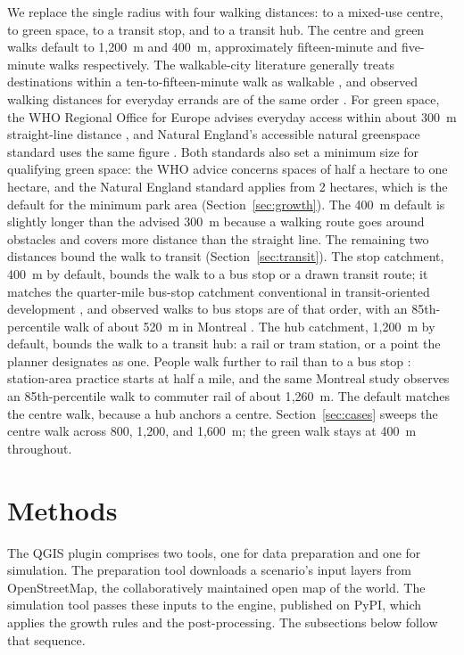 \documentclass[11pt]{article}
\begin{document}
We replace the single radius with four walking distances: to a mixed-use centre, to green space, to a transit stop, and to a transit hub. The centre and green walks default to 1{,}200~m and 400~m, approximately fifteen-minute and five-minute walks respectively. The walkable-city literature generally treats
destinations within a ten-to-fifteen-minute walk as walkable
\citep{moreno2021, abbiasov2024}, and observed walking distances for
everyday errands are of the same order \citep{yang_diezroux2012}. For
green space, the WHO Regional Office for Europe advises everyday access
within about 300~m straight-line distance \citep{who2016}, and Natural
England's accessible natural greenspace standard uses the same figure
\citep{naturalengland2010}. Both standards also set a minimum size
for qualifying green space: the WHO advice concerns spaces of half
a hectare to one hectare, and the Natural England standard
applies from 2 hectares, which is the default for the
minimum park area (Section~\ref{sec:growth}). The 400~m default is slightly
longer than the advised 300~m because a walking route goes around
obstacles and covers more distance than the straight line.
The remaining two distances bound the walk to transit (Section~\ref{sec:transit}). The
stop catchment, 400~m by default, bounds the walk to a bus stop or a
drawn transit route; it matches the quarter-mile bus-stop catchment
conventional in transit-oriented development \citep{calthorpe1993,
ibraeva2020}, and observed walks to bus stops are of that order,
with an 85th-percentile walk of about 520~m in Montreal
\citep{elgeneidy2014}. The hub catchment, 1{,}200~m by default, bounds the walk to a transit hub: a rail or tram station, or a point the planner designates as one. People walk
further to rail than to a bus stop \citep{daniels_mulley2013}:
station-area practice starts at half a mile, and the same Montreal
study observes an 85th-percentile walk to commuter rail of about
1{,}260~m. The default matches the centre walk, because a hub
anchors a centre.
Section~\ref{sec:cases} sweeps the centre walk across 800, 1{,}200,
and 1{,}600~m; the green walk stays at 400~m throughout.

\section{Methods}
\label{sec:methods}

The QGIS plugin comprises two tools, one for data preparation and one
for simulation. The preparation tool downloads a scenario's input
layers from OpenStreetMap, the collaboratively maintained open map
of the world. The simulation tool passes these inputs to the
engine, published on PyPI, which applies the growth rules and the
post-processing. The subsections below follow that sequence.
\end{document}

